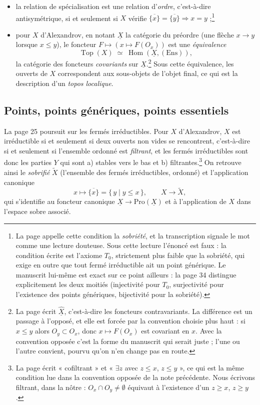 \documentclass[11pt,a4paper]{article}
\begin{document}
\begin{itemize}
\item la relation de spécialisation est une relation d'\emph{ordre}, c'est-à-dire
antisymétrique, si et seulement si $X$ vérifie $\overline{\{x\}} =
\overline{\{y\}} \Rightarrow x = y$ ;\footnote{La page appelle cette condition
la \emph{sobriété}, et la transcription signale le mot comme une lecture
douteuse. Sous cette lecture l'énoncé est faux : la condition écrite est
l'axiome $T_{0}$, strictement plus faible que la sobriété, qui exige en outre
que tout fermé irréductible ait un point générique. Le manuscrit lui-même est
exact sur ce point ailleurs : la page 34 distingue explicitement les deux
moitiés (injectivité pour $T_{0}$, surjectivité pour l'existence des points
génériques, bijectivité pour la sobriété).}
\item pour $X$ d'Alexandrov, en notant $\underline{X}$ la catégorie du
préordre (une flèche $x \to y$ lorsque $x \leq y$), le foncteur
$F \mapsto (x \mapsto F(O_{x}))$ est une \emph{équivalence}
\[
\operatorname{Top}(X) \;\simeq\; \operatorname{Hom}(\underline{X},
(\mathrm{Ens})),
\]
la catégorie des foncteurs \emph{covariants} sur $\underline{X}$.\footnote{La
page écrit $\widehat{\underline{X}}$, c'est-à-dire les foncteurs
contravariants. La différence est un passage à l'opposé, et elle est forcée par
la convention choisie plus haut : si $x \leq y$ alors $O_{y} \subset O_{x}$,
donc $x \mapsto F(O_{x})$ est covariant en $x$. Avec la convention opposée
c'est la forme du manuscrit qui serait juste ; l'une ou l'autre convient,
pourvu qu'on n'en change pas en route.} Sous cette équivalence, les ouverts de
$X$ correspondent aux sous-objets de l'objet final, ce qui est la description
d'un \emph{topos localique}.
\end{itemize}

\subsection*{Points, points génériques, points essentiels}

La page 25 poursuit sur les fermés irréductibles. Pour $X$ d'Alexandrov, $X$
est irréductible si et seulement si deux ouverts non vides se rencontrent,
c'est-à-dire si et seulement si l'ensemble ordonné est \emph{filtrant}, et les
fermés irréductibles sont donc les parties $Y$ qui sont a) stables vers le bas
et b) filtrantes.\footnote{La page écrit « cofiltrant » et « $\exists z$ avec
$z \leq x$, $z \leq y$ », ce qui est la même condition lue dans la convention
opposée de la note précédente. Nous écrivons filtrant, dans la nôtre :
$O_{x} \cap O_{y} \neq \emptyset$ équivaut à l'existence d'un $z \geq x$,
$z \geq y$.} On retrouve ainsi le \emph{sobrifié} $\widetilde{X}$ (l'ensemble
des fermés irréductibles, ordonné) et l'application canonique
\[
x \longmapsto \overline{\{x\}} = \{\, y \mid y \leq x \,\},
\qquad X \longrightarrow \widetilde{X},
\]
qui s'identifie au foncteur canonique $\underline{X} \to
\mathrm{Pro}(\underline{X})$ et à l'application de $X$ dans l'espace sobre
associé.
\end{document}
